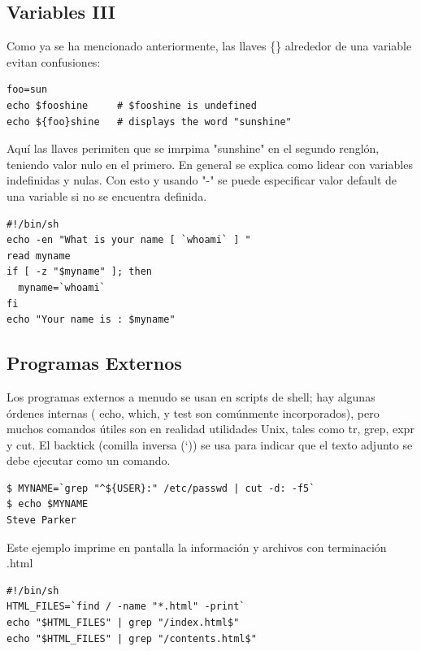 \documentclass[12pt]{article}
\begin{document}
\subsection*{Variables III}
Como ya se ha mencionado anteriormente, las llaves \{\} alrededor de una variable evitan confusiones:
\begin{verbatim}
foo=sun
echo $fooshine     # $fooshine is undefined
echo ${foo}shine   # displays the word "sunshine"
\end{verbatim}
Aquí las llaves perimiten que se imrpima "sunshine" en el segundo renglón, teniendo valor nulo en el primero. En general se explica como lidear con variables indefinidas y nulas. Con esto y usando "-" se puede especificar valor default de una variable si no se encuentra definida.
\begin{verbatim}
#!/bin/sh
echo -en "What is your name [ `whoami` ] "
read myname
if [ -z "$myname" ]; then
  myname=`whoami`
fi
echo "Your name is : $myname"
\end{verbatim}

\subsection*{Programas Externos}
Los programas externos a menudo se usan en scripts de shell; hay algunas órdenes internas ( echo, which, y test son comúnmente incorporados), pero muchos comandos útiles son en realidad utilidades Unix, tales como tr, grep, expr y cut. El backtick (comilla inversa (`)) se usa para indicar que el texto adjunto se debe ejecutar como un comando.
\begin{verbatim}
$ MYNAME=`grep "^${USER}:" /etc/passwd | cut -d: -f5`
$ echo $MYNAME
Steve Parker
\end{verbatim}
Este ejemplo imprime en pantalla la información y archivos con terminación .html
\begin{verbatim}
#!/bin/sh
HTML_FILES=`find / -name "*.html" -print`
echo "$HTML_FILES" | grep "/index.html$"
echo "$HTML_FILES" | grep "/contents.html$"
\end{verbatim}
\end{document}
